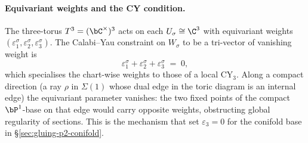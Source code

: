 \paragraph{Equivariant weights and the CY condition.}
The three-torus $T^3 = (\bC^\times)^3$ acts on each $U_\sigma \cong \C^3$
with equivariant weights $(\varepsilon_1^\sigma, \varepsilon_2^\sigma,
\varepsilon_3^\sigma)$. The Calabi--Yau constraint on $W_\sigma$ to be a
tri-vector of vanishing weight is
\[
 \varepsilon_1^\sigma + \varepsilon_2^\sigma + \varepsilon_3^\sigma \;=\; 0,
\]
which specialises the chart-wise weights to those of a local CY$_3$. Along
a compact direction (a ray $\rho$ in $\Sigma(1)$ whose dual edge in the
toric diagram is an internal edge) the equivariant parameter vanishes:
the two fixed points of the compact $\bP^1$-base on that edge would carry
opposite weights, obstructing global regularity of sections. This is the
mechanism that set $\varepsilon_3 = 0$ for the conifold base in
\S\ref{sec:gluing-p2-conifold}.

